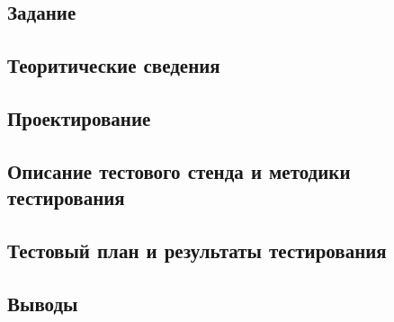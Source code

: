 \documentclass[12pt,a4paper]{report}
\begin{document}
\subsection{Задание}
\subsection{Теоритические сведения}
\subsection{Проектирование}
\subsection{Описание тестового стенда и методики тестирования}
\subsection{Тестовый план и результаты тестирования}
\subsection{Выводы}
\end{document}
